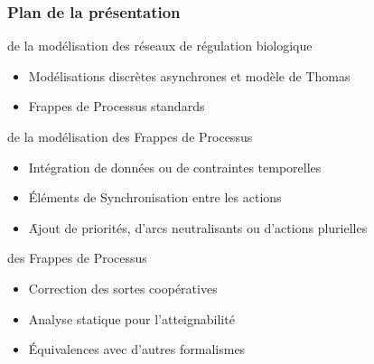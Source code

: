 \begin{frame}[c]
\frametitle{Plan de la présentation}

 de la modélisation des réseaux de régulation biologique
\begin{itemize}
  \item Modélisations discrètes asynchrones et modèle de Thomas
  \item Frappes de Processus standards
\end{itemize}

\pause
\bigskip
{} de la modélisation des Frappes de Processus
\begin{itemize}
  \item Intégration de données ou de contraintes temporelles
  \item Éléments de Synchronisation entre les actions
  \item[] \quad \f Ajout de priorités, d'arcs neutralisants ou d'actions plurielles
\end{itemize}

\pause
\bigskip
{} des Frappes de Processus
\begin{itemize}
  \item Correction des sortes coopératives
  \item Analyse statique pour l'atteignabilité
  \item Équivalences avec d'autres formalismes
\end{itemize}

\end{frame}
